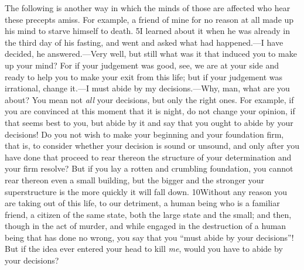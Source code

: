 The following is another way in which the minds of those are affected who hear these precepts amiss. For example, a friend of mine for no reason at all made up his mind to starve himself to death. 5I learned about it when he was already in the third day of his fasting, and went and asked what had happened.—I have decided, he answered.—Very well, but still what was it that induced you to make up your mind? For if your judgement was good, see, we are at your side and ready to help you to make your exit from this life; but if your judgement was irrational, change it.—I must abide by my decisions.—Why, man, what are you about? You mean not \emph{all} your decisions, but only the right ones. For example, if you are convinced at this moment that it is night, do not change your opinion, if that seems best to you, but abide by it and say that you ought to abide by your decisions! Do you not wish to make your beginning and your foundation firm, that is, to consider whether your decision is sound or unsound, and only after you have done that proceed to rear thereon the structure of your determination and your firm resolve? But if you lay a rotten and crumbling foundation, you cannot rear thereon even a small building, but the bigger and the stronger your superstructure is the more quickly it will fall down. 10Without any reason you are taking out of this life, to our detriment, a human being who is a familiar friend, a citizen of the same state, both the large state and the small; and then, though in the act of murder, and while engaged in the destruction of a human being that has done no wrong, you say that you ``must abide by your decisions''! But if the idea ever entered your head to kill \emph{me}, would you have to abide by your decisions?

